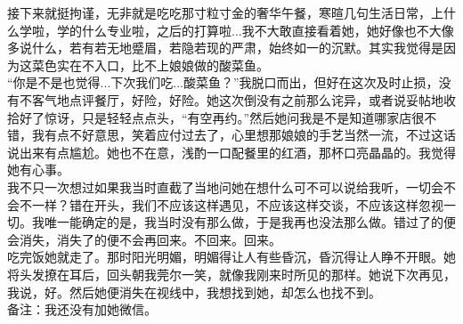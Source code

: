 \documentclass[letterpaper, 12pt]{article}
\begin{document}
\begin{multicols}{2}
接下来就挺拘谨，无非就是吃吃那寸粒寸金的奢华午餐，寒暄几句生活日常，上什么学啦，学的什么专业啦，之后的打算啦...我不大敢直接看着她，她好像也不大像多说什么，若有若无地蹙眉，若隐若现的严肃，始终如一的沉默。其实我觉得是因为这菜色实在不入口，比不上娘娘做的酸菜鱼。\\

“你是不是也觉得...下次我们吃...酸菜鱼？”我脱口而出，但好在这次及时止损，没有不客气地点评餐厅，好险，好险。她这次倒没有之前那么诧异，或者说妥帖地收拾好了惊讶，只是轻轻点点头，“有空再约。”然后她问我是不是知道哪家店很不错，我有点不好意思，笑着应付过去了，心里想那娘娘的手艺当然一流，不过这话说出来有点尴尬。她也不在意，浅酌一口配餐里的红酒，那杯口亮晶晶的。我觉得她有心事。\\

我不只一次想过如果我当时直截了当地问她在想什么可不可以说给我听，一切会不会不一样？错在开头，我们不应该这样遇见，不应该这样交谈，不应该这样忽视一切。我唯一能确定的是，我当时没有那么做，于是我再也没法那么做。错过了的便会消失，消失了的便不会再回来。不回来。回来。\\

吃完饭她就走了。那时阳光明媚，明媚得让人有些昏沉，昏沉得让人睁不开眼。她将头发撩在耳后，回头朝我莞尔一笑，就像我刚来时所见的那样。她说下次再见，我说，好。然后她便消失在视线中，我想找到她，却怎么也找不到。\\

备注：我还没有加她微信。

\end{multicols} 
\end{document}
